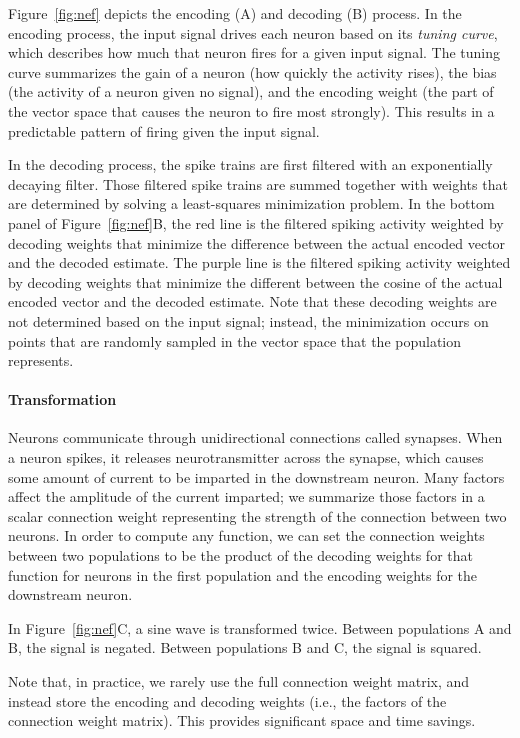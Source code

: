 \documentclass{frontiersSCNS}
\begin{document}
Figure~\ref{fig:nef} depicts
the encoding (A) and decoding (B) process.
In the encoding process, the input signal drives
each neuron based on its \textit{tuning curve},
which describes how much
that neuron fires for a given input signal.
The tuning curve summarizes the gain
of a neuron (how quickly the activity rises),
the bias (the activity of a neuron given no signal),
and the encoding weight
(the part of the vector space
that causes the neuron to fire most strongly).
This results in a predictable pattern of firing
given the input signal.

In the decoding process,
the spike trains are first filtered
with an exponentially decaying filter.
Those filtered spike trains are summed together
with weights that are determined
by solving a least-squares minimization problem.
In the bottom panel of Figure~\ref{fig:nef}B,
the red line is the filtered spiking activity
weighted by decoding weights
that minimize the difference between
the actual encoded vector
and the decoded estimate.
The purple line is the filtered spiking activity
weighted by decoding weights
that minimize the different between
the cosine of the actual encoded vector
and the decoded estimate.
Note that these decoding weights are not determined
based on the input signal;
instead, the minimization occurs
on points that are randomly sampled
in the vector space
that the population represents.

\paragraph{Transformation}
Neurons communicate through
unidirectional connections called synapses.
When a neuron spikes,
it releases neurotransmitter across the synapse,
which causes some amount of current
to be imparted in the downstream neuron.
Many factors affect the
amplitude of the current imparted;
we summarize those factors
in a scalar connection weight
representing the strength
of the connection between two neurons.
In order to compute any function,
we can set the connection weights between
two populations to be the product of
the decoding weights for that function
for neurons in the first population
and the encoding weights
for the downstream neuron.

In Figure~\ref{fig:nef}C,
a sine wave is transformed twice.
Between populations A and B,
the signal is negated.
Between populations B and C,
the signal is squared.

Note that, in practice, we rarely use
the full connection weight matrix,
and instead store
the encoding and decoding weights
(i.e., the factors of the connection weight matrix).
This provides significant
space and time savings.
\end{document}
